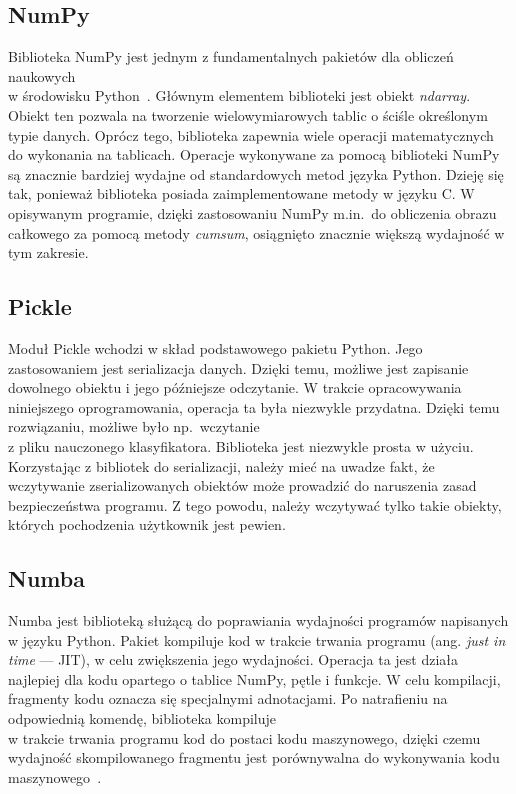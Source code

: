 \subsection{NumPy}
Biblioteka NumPy jest jednym z fundamentalnych pakietów dla obliczeń naukowych \\w środowisku Python~\cite{numpy}.
Głównym elementem biblioteki jest obiekt \textit{ndarray}.
Obiekt ten pozwala na tworzenie wielowymiarowych tablic o ściśle określonym typie danych.
Oprócz tego, biblioteka zapewnia wiele operacji matematycznych do wykonania na tablicach.
Operacje wykonywane za pomocą biblioteki NumPy są znacznie bardziej wydajne od standardowych metod języka Python.
Dzieję się tak, ponieważ biblioteka posiada zaimplementowane metody w języku C\@.
W opisywanym programie, dzięki zastosowaniu NumPy m.in.\ do obliczenia obrazu całkowego za pomocą metody \textit{cumsum}, osiągnięto znacznie większą wydajność w tym zakresie.

\subsection{Pickle}
Moduł Pickle wchodzi w skład podstawowego pakietu Python.
Jego zastosowaniem jest serializacja danych.
Dzięki temu, możliwe jest zapisanie dowolnego obiektu i jego późniejsze odczytanie.
W trakcie opracowywania niniejszego oprogramowania, operacja ta była niezwykle przydatna.
Dzięki temu rozwiązaniu, możliwe było np.\ wczytanie \\z pliku nauczonego klasyfikatora.
Biblioteka jest niezwykle prosta w użyciu.
Korzystając z bibliotek do serializacji, należy mieć na uwadze fakt, że wczytywanie zserializowanych obiektów może prowadzić do naruszenia zasad bezpieczeństwa programu.
Z tego powodu, należy wczytywać tylko takie obiekty, których pochodzenia użytkownik jest pewien.

\subsection{Numba}
Numba jest biblioteką służącą do poprawiania wydajności programów napisanych w języku Python.
Pakiet kompiluje kod w trakcie trwania programu (ang. \textit{just in time} --- JIT), w celu zwiększenia jego wydajności.
Operacja ta jest działa najlepiej dla kodu opartego o tablice NumPy, pętle i funkcje.
W celu kompilacji, fragmenty kodu oznacza się specjalnymi adnotacjami.
Po natrafieniu na odpowiednią komendę, biblioteka kompiluje \\w trakcie trwania programu kod do postaci kodu maszynowego, dzięki czemu wydajność skompilowanego fragmentu jest porównywalna do wykonywania kodu maszynowego~\cite{numba}.

